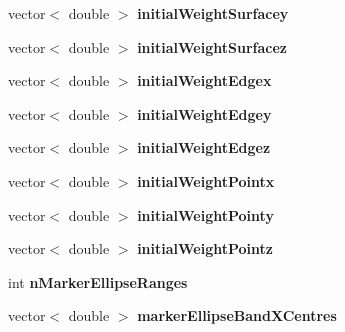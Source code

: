 \begin{DoxyCompactItemize}
\item 
\hypertarget{classSimulation_a03a1bbd006e3cc02b41ccd23fc883254}{}vector$<$ double $>$ {\bfseries initial\+Weight\+Surfacey}\label{classSimulation_a03a1bbd006e3cc02b41ccd23fc883254}

\item 
\hypertarget{classSimulation_ae9856992125aab67355a3ca1033ed46f}{}vector$<$ double $>$ {\bfseries initial\+Weight\+Surfacez}\label{classSimulation_ae9856992125aab67355a3ca1033ed46f}

\item 
\hypertarget{classSimulation_aef3f9aac298fbd7840e143c67d91e30c}{}vector$<$ double $>$ {\bfseries initial\+Weight\+Edgex}\label{classSimulation_aef3f9aac298fbd7840e143c67d91e30c}

\item 
\hypertarget{classSimulation_a94872d7ede013c3916f5beeb9bf7baf5}{}vector$<$ double $>$ {\bfseries initial\+Weight\+Edgey}\label{classSimulation_a94872d7ede013c3916f5beeb9bf7baf5}

\item 
\hypertarget{classSimulation_a4d8f51721428fccfb1cd32de46b1d0bf}{}vector$<$ double $>$ {\bfseries initial\+Weight\+Edgez}\label{classSimulation_a4d8f51721428fccfb1cd32de46b1d0bf}

\item 
\hypertarget{classSimulation_a5729bbbf97bb6870254c7f2bd55d5e55}{}vector$<$ double $>$ {\bfseries initial\+Weight\+Pointx}\label{classSimulation_a5729bbbf97bb6870254c7f2bd55d5e55}

\item 
\hypertarget{classSimulation_a27a788f83ff23d792139cd59ce56686d}{}vector$<$ double $>$ {\bfseries initial\+Weight\+Pointy}\label{classSimulation_a27a788f83ff23d792139cd59ce56686d}

\item 
\hypertarget{classSimulation_abb673b86b72a2f3924b1c011865bbbcd}{}vector$<$ double $>$ {\bfseries initial\+Weight\+Pointz}\label{classSimulation_abb673b86b72a2f3924b1c011865bbbcd}

\item 
\hypertarget{classSimulation_a6a035fd880a67421014b46a9a85c6cbd}{}int {\bfseries n\+Marker\+Ellipse\+Ranges}\label{classSimulation_a6a035fd880a67421014b46a9a85c6cbd}

\item 
\hypertarget{classSimulation_a07aa41e98dafa714c94e1d788cf70911}{}vector$<$ double $>$ {\bfseries marker\+Ellipse\+Band\+X\+Centres}\label{classSimulation_a07aa41e98dafa714c94e1d788cf70911}


\end{DoxyCompactItemize}
